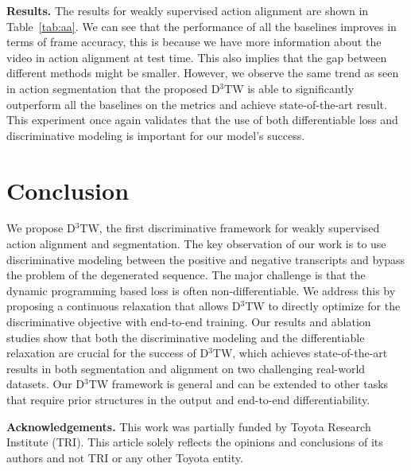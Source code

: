 \documentclass[10pt,twocolumn,letterpaper]{article}
\newcommand{\dttw}{D${}^3$TW\xspace}
\begin{document}
\vspace{1mm}
{\noindent \bf Results.} The results for weakly supervised action alignment are shown in Table~\ref{tab:aa}. We can see that the performance of all the baselines improves in terms of frame accuracy, this is because we have more information about the video in action alignment at test time. This also implies that the gap between different methods might be smaller. However, we observe the same trend as seen in action segmentation that the proposed \dttw is able to significantly outperform all the baselines on the metrics and achieve state-of-the-art result. This experiment once again validates that the use of both differentiable loss and discriminative modeling is important for our model's success. \section{Conclusion}
\label{sec:conclusion}

We propose \dttw, the first discriminative framework for weakly supervised action alignment and segmentation. The key observation of our work is to use discriminative modeling between the positive and negative transcripts and bypass the problem of the degenerated sequence. The major challenge is that the dynamic programming based loss is often non-differentiable. We address this by proposing a continuous relaxation that allows \dttw to directly optimize for the discriminative objective with end-to-end training. Our results and ablation studies show that both the discriminative modeling and the differentiable relaxation are crucial for the success of \dttw, which achieves state-of-the-art results in both segmentation and alignment on two challenging real-world datasets. Our \dttw framework is general and can be extended to other tasks that require prior structures in the output and end-to-end differentiability.

\vspace{+2mm}
{\noindent \bf Acknowledgements.}
This work was partially funded by Toyota Research Institute (TRI). This article solely reflects the opinions and conclusions of its authors and not TRI or any other Toyota entity. 
\end{document}

